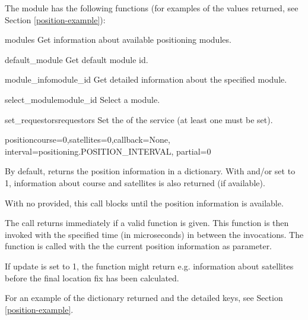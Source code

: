 The  module has the following functions (for examples of the 
values returned, see Section \ref{position-example}):

\begin{funcdesc}{modules}{}
Get information about available positioning modules.
\end{funcdesc}

\begin{funcdesc}{default_module}{}
Get default module id.
\end{funcdesc}

\begin{funcdesc}{module_info}{module_id}
Get detailed information about the specified module.
\end{funcdesc}

\begin{funcdesc}{select_module}{module_id}
Select a module.
\end{funcdesc}

\begin{funcdesc}{set_requestors}{requestors}
Set the  of the service (at least one must be set).
\end{funcdesc}

\begin{funcdesc}{position}{course=0,satellites=0,callback=None,
                          interval=positioning.POSITION_INTERVAL, partial=0}

By default, returns the position information in a dictionary. With  
and/or  set to 1, information about course and satellites is 
also returned (if available).

With no  provided, this call blocks until the position information 
is available.

The call returns immediately if a valid  function is given. This 
 function is then invoked with the specified time  
(in microseconds) in between the invocations. The  function is 
called with the the current position information as parameter.

If  update is set to 1, the function might return e.g. information 
about satellites before the final location fix has been calculated.

For an example of the dictionary returned and the detailed keys, see Section 
\ref{position-example}.

\end{funcdesc}

